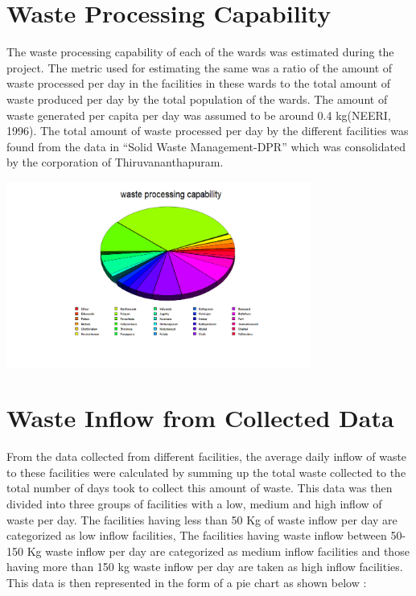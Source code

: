 \documentclass[12pt,a4paper]{report}
\begin{document}
\section{Waste Processing Capability}
\begin{justify}
	The waste processing capability of each of the wards was estimated during the project. The metric used for estimating the same was a ratio of the amount of waste processed per day in the facilities in these wards to the total amount of waste produced per day by the total population of the wards. 
	The amount of waste generated per capita per day was assumed to be around 0.4 kg(NEERI, 1996).
	The total amount of waste processed per day by the different facilities was found from the data in “Solid Waste Management-DPR” which was consolidated by the corporation of Thiruvananthapuram.
	
	\centering
	\includegraphics[width=0.75\textwidth]{wp}
	

	
\end{justify}
\section{Waste Inflow from Collected Data}
From the data collected from different facilities, the average daily inflow of waste to these facilities were calculated by summing up the total waste collected to the total number of days took to collect this amount of waste. This data was then divided into three groups of facilities with a low, medium and high inflow of waste per day. The facilities having less than 50 Kg of waste inflow per day are categorized as low inflow facilities, The facilities having waste inflow between 50-150 Kg waste inflow per day are categorized as medium inflow facilities and those having more than 150 kg waste inflow per day are taken as high inflow facilities. This data is then represented in  the form of a pie chart as shown below :
\end{document}

